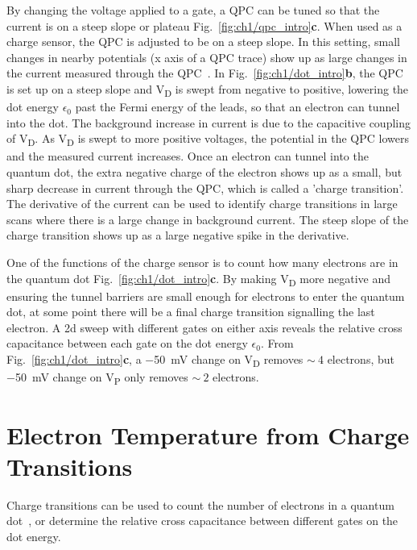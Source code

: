 By changing the voltage applied to a gate, a QPC can be tuned so that the current is on a steep slope or plateau Fig.~\ref{fig:ch1/qpc_intro}\textbf{c}. When used as a charge sensor, the QPC is adjusted to be on a steep slope. In this setting, small changes in nearby potentials (x axis of a QPC trace) show up as large changes in the current measured through the QPC~\cite{cs_design}. In Fig.~\ref{fig:ch1/dot_intro}\textbf{b}, the QPC is set up on a steep slope and V\textsubscript{D} is swept from negative to positive, lowering the dot energy $\epsilon_0$ past the Fermi energy of the leads, so that an electron can tunnel into the dot. The background increase in current is due to the capacitive coupling of V\textsubscript{D}. As V\textsubscript{D} is swept to more positive voltages, the potential in the QPC lowers and the measured current increases. Once an electron can tunnel into the quantum dot, the extra negative charge of the electron shows up as a small, but sharp decrease in current through the QPC, which is called a 'charge transition'. The derivative of the current can be used to identify charge transitions in large scans where there is a large change in background current. The steep slope of the charge transition shows up as a large negative spike in the derivative. 

One of the functions of the charge sensor is to count how many electrons are in the quantum dot Fig.~\ref{fig:ch1/dot_intro}\textbf{c}. By making V\textsubscript{D} more negative and ensuring the tunnel barriers are small enough for electrons to enter the quantum dot, at some point there will be a final charge transition signalling the last electron. A 2d sweep with different gates on either axis reveals the relative cross capacitance between each gate on the dot energy $\epsilon_0$. From Fig.~\ref{fig:ch1/dot_intro}\textbf{c}, a \qty{-50}{mV} change on V\textsubscript{D} removes $\sim~4$ electrons, but \qty{-50}{mV} change on V\textsubscript{P} only removes $\sim~2$ electrons.



\section{Electron Temperature from Charge Transitions}



Charge transitions can be used to count the number of electrons in a quantum dot~\cite{electron_counting}, or determine the relative cross capacitance between different gates on the dot energy.

